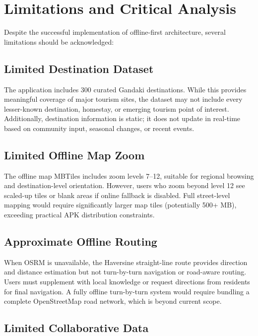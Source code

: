 \documentclass[12pt,a4paper,oneside]{report}
\begin{document}
\section{Limitations and Critical Analysis}
\label{sec:limitations}

Despite the successful implementation of offline-first architecture, several limitations should be acknowledged:

\subsection{Limited Destination Dataset}

The application includes 300 curated Gandaki destinations. While this provides meaningful coverage of major tourism sites, the dataset may not include every lesser-known destination, homestay, or emerging tourism point of interest. Additionally, destination information is static; it does not update in real-time based on community input, seasonal changes, or recent events.

\subsection{Limited Offline Map Zoom}

The offline map MBTiles includes zoom levels 7--12, suitable for regional browsing and destination-level orientation. However, users who zoom beyond level 12 see scaled-up tiles or blank areas if online fallback is disabled. Full street-level mapping would require significantly larger map tiles (potentially 500+ MB), exceeding practical APK distribution constraints.

\subsection{Approximate Offline Routing}

When OSRM is unavailable, the Haversine straight-line route provides direction and distance estimation but not turn-by-turn navigation or road-aware routing. Users must supplement with local knowledge or request directions from residents for final navigation. A fully offline turn-by-turn system would require bundling a complete OpenStreetMap road network, which is beyond current scope.

\subsection{Limited Collaborative Data}
\end{document}
